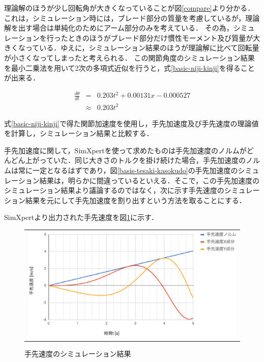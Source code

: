 理論解のほうが少し回転角が大きくなっていることが図\ref{compare}より分かる．これは，シミュレーション時には，ブレード部分の質量を考慮しているが，理論解を出す場合は単純化のためにアーム部分のみを考えている．
その為，シミュレーションを行ったときのほうがブレード部分だけ慣性モーメント及び質量が大きくなっている．ゆえに，シミュレーション結果のほうが理論解に比べて回転量が小さくなってしまったと考えられる．
この関節角度のシミュレーション結果を最小二乗法を用いて2次の多項式近似を行うと，式\ref{basic-niji-kinji}を得ることが出来る．

\begin{eqnarray}
  \frac{d\theta}{dt} &=& 0.203t^2+0.00131x-0.000527 \nonumber \\
  &\approx& 0.203t^2
  \label{basic-niji-kinji}
\end{eqnarray}

式\ref{basic-niji-kinji}で得た関節加速度を使用し，手先加速度及び手先速度の理論値を計算し，シミュレーション結果と比較する．

手先加速度に関して，SimXpertを使って求めたものは手先加速度のノルムがどんどん上がっていた．同じ大きさのトルクを掛け続けた場合，手先加速度のノルムは常に一定となるはずであり，図\ref{basis-tesaki-kasokudo}の手先加速度のシミュレーション結果は，明らかに間違っているといえる．そこで，この手先加速度のシミュレーション結果より議論するのではなく，次に示す手先速度のシミュレーション結果を元にして手先加速度を割り出すという方法を取ることにする．

SimXpertより出力された手先速度を図\ref{basis-tesaki-sokudo}に示す．

\begin{figure}[htbp]
  \begin{center}
    \begin{tabular}{c}
      \includegraphics[height=5.5cm]{img/eps/basis-tesaki-sakudo2.eps}
    \end{tabular}
    \caption{手先速度のシミュレーション結果}
    \label{basis-tesaki-sokudo}
  \end{center}
\end{figure}

